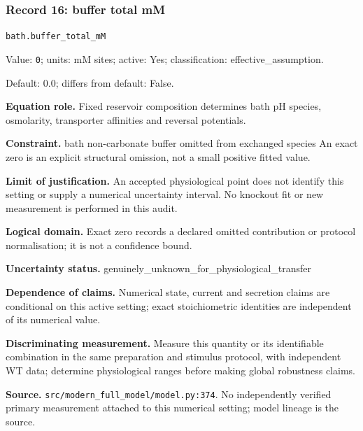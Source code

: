 \subsubsection*{Record 16: buffer total mM}
{\small \nolinkurl{bath.buffer_total_mM}\par

Value: \texttt{0}; units: mM sites; active: Yes; classification: effective\_assumption.\par

Default: 0.0; differs from default: False.\par

\textbf{Equation role.} Fixed reservoir composition determines bath pH species, osmolarity, transporter affinities and reversal potentials.\par

\textbf{Constraint.} bath non-carbonate buffer omitted from exchanged species An exact zero is an explicit structural omission, not a small positive fitted value.\par

\textbf{Limit of justification.} An accepted physiological point does not identify this setting or supply a numerical uncertainty interval. No knockout fit or new measurement is performed in this audit.\par

\textbf{Logical domain.} Exact zero records a declared omitted contribution or protocol normalisation; it is not a confidence bound.\par

\textbf{Uncertainty status.} genuinely\_unknown\_for\_physiological\_transfer\par

\textbf{Dependence of claims.} Numerical state, current and secretion claims are conditional on this active setting; exact stoichiometric identities are independent of its numerical value.\par

\textbf{Discriminating measurement.} Measure this quantity or its identifiable combination in the same preparation and stimulus protocol, with independent WT data; determine physiological ranges before making global robustness claims.\par

\textbf{Source.} \nolinkurl{src/modern_full_model/model.py:374}. No independently verified primary measurement attached to this numerical setting; model lineage is the source.\par}

